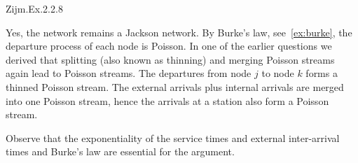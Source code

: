 \begin{exercise}
Zijm.Ex.2.2.8
\begin{solution}
 Yes, the network remains a Jackson network. By Burke's law, see~\cref{ex:burke}, the
 departure process of each node is Poisson. In one of the earlier
 questions we derived that splitting (also known as thinning) and
 merging Poisson streams again lead to Poisson streams. The
 departures from node $j$ to node $k$ forms a thinned Poisson
 stream. The external arrivals plus internal arrivals are merged into
 one Poisson stream, hence the arrivals at a station also form a Poisson stream.

 Observe that the exponentiality of the service times and external
 inter-arrival times and Burke's law are essential for the argument.
\end{solution}
\end{exercise}








